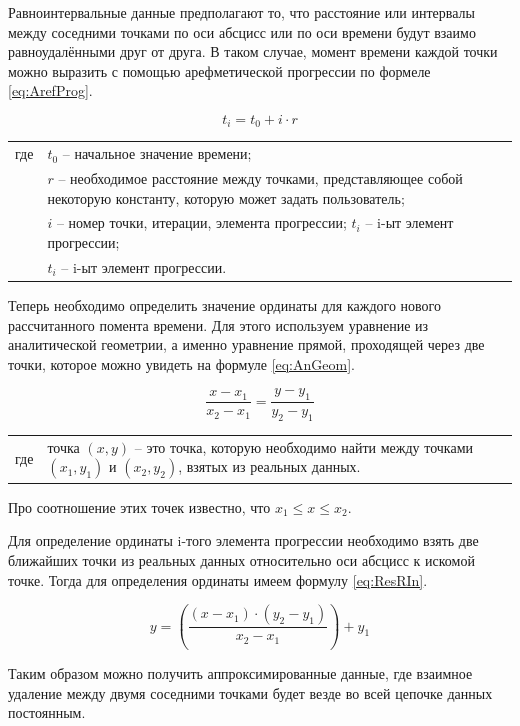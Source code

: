 {\standartFont

  \par Равноинтервальные данные предполагают то, что расстояние или интервалы между соседними точками по оси абсцисс или по оси времени будут взаимо равноудалёнными друг от друга. В таком случае, момент времени каждой точки можно выразить с помощью арефметической прогрессии по формеле \ref{eq:ArefProg}.

  \begin{equation} \label{eq:ArefProg}
    t_i = t_0 + i \cdot r
  \end{equation}

  \begin{tabular}{p{}p{}}
		где  & $t_0$ {--} начальное значение времени; \\
		 	   & $r$ {--} необходимое расстояние между точками, представляющее собой некоторую константу, которую может задать пользователь; \\
     	   & $i$ {--} номер точки, итерации, элемента прогрессии; $t_i$ {--} i-ыт элемент прогрессии;  \\
     	   & $t_i$ {--} i-ыт элемент прогрессии. \\
  \end{tabular}

  \par Теперь необходимо определить значение ординаты для каждого нового рассчитанного помента времени. Для этого используем уравнение из аналитической геометрии, а именно уравнение прямой, проходящей через две точки, которое можно увидеть на формуле \ref{eq:AnGeom}.

  \begin{equation} \label{eq:AnGeom}
    \frac{x - x_1}{x_2 - x_1} = \frac{y - y_1}{y_2 - y_1}
  \end{equation}

  \begin{tabular}{p{}p{}}
    где  & точка $\left(x, y\right)$ {--} это точка, которую необходимо найти между точками $\left(x_1, y_1\right)$ и $\left(x_2, y_2\right)$, взятых из реальных данных. \\
  \end{tabular}

  \par Про соотношение этих точек известно, что $x_1 \leq x \leq x_2$.

  \par Для определение ординаты i-того элемента прогрессии необходимо взять две ближайших точки из реальных данных относительно оси абсцисс к искомой точке. Тогда для определения ординаты имеем формулу \ref{eq:ResRIn}.

  \begin{equation} \label{eq:ResRIn}
    y = \left(\frac{\left(x - x_1\right) \cdot \left(y_2 - y_1\right)}{x_2 - x_1}\right) + y_1
  \end{equation}

  \par Таким образом можно получить аппроксимированные данные, где взаимное удаление между двумя соседними точками будет везде во всей цепочке данных постоянным.  

  \par 
}

